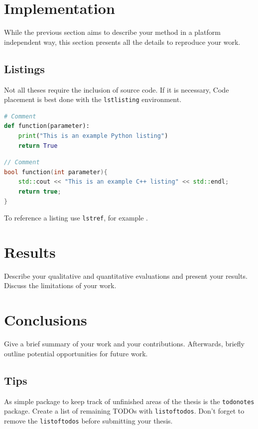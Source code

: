 \documentclass[english, egger, bsc]{vcethesis}
\begin{document}
\chapter{Implementation}

While the previous section aims to describe your method in a platform independent way, this  section presents all the details to reproduce your work.

\section{Listings}

Not all theses require the inclusion of source code. 
If it is necessary, Code placement is best done with the \texttt{lstlisting} environment.
\begin{lstlisting}[language=Python, caption=Caption of the Python Listing, label={lst:my_label1}]
# Comment
def function(parameter):
    print("This is an example Python listing")
    return True
\end{lstlisting}

\begin{lstlisting}[language=C++, caption=Caption of the C++ Listing, label={lst:my_label2}]
// Comment
bool function(int parameter){
    std::cout << "This is an example C++ listing" << std::endl;
    return true;
}
\end{lstlisting}
To reference a listing use \texttt{lstref}, for example .

\chapter{Results}
Describe your qualitative and quantitative evaluations and present your results.
Discuss the limitations of your work.

\chapter{Conclusions}
Give a brief summary of your work and your contributions.
Afterwards, briefly outline potential opportunities for future work.

\section{Tips}
As simple package to keep track of unfinished areas of the thesis is the \texttt{todonotes} package.  
Create a list of remaining TODOs with \texttt{listoftodos}. Don't forget to remove the \texttt{listoftodos} before submitting your thesis.
\listoftodos
\end{document}
